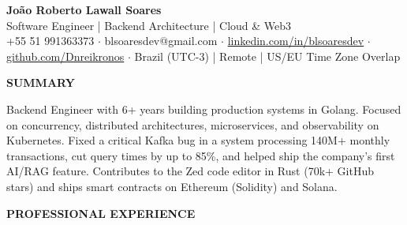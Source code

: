 \documentclass[10pt,a4paper]{article}
\newcommand{\cvsection}[1]{%
    \vspace{8pt}%
    {\large\bfseries\uppercase{#1}}\\[2pt]%
    \vspace{2pt}%
}
\begin{document}
\begin{center}
    {\LARGE\bfseries\color{headercolor} João Roberto Lawall Soares}\\[3pt]
    {\normalsize Software Engineer | Backend Architecture | Cloud \& Web3}\\[4pt]
    {\footnotesize +55 51 991363373 $\cdot$ blsoaresdev@gmail.com $\cdot$ \href{https://www.linkedin.com/in/blsoaresdev/}{linkedin.com/in/blsoaresdev} $\cdot$ \href{https://github.com/Dnreikronos}{github.com/Dnreikronos} $\cdot$ Brazil (UTC-3) | Remote | US/EU Time Zone Overlap}
\end{center}

\cvsection{Summary}
{\footnotesize Backend Engineer with 6+ years building production systems in Golang. Focused on concurrency, distributed architectures, microservices, and observability on Kubernetes. Fixed a critical Kafka bug in a system processing 140M+ monthly transactions, cut query times by up to 85\%, and helped ship the company's first AI/RAG feature. Contributes to the Zed code editor in Rust (70k+ GitHub stars) and ships smart contracts on Ethereum (Solidity) and Solana.}

\cvsection{Professional Experience}
\end{document}
